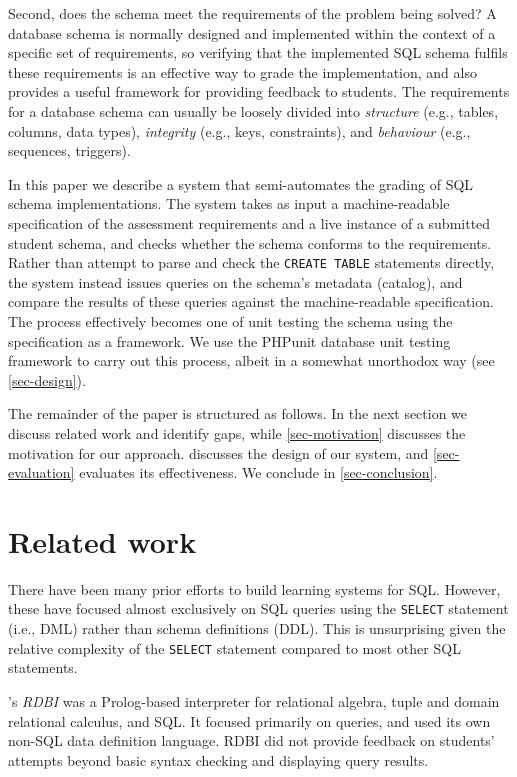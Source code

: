 \documentclass[sigconf, authordraft, capitalise]{acmart}
\begin{document}
Second, does the schema meet the requirements of the problem being solved? A database schema is normally designed and implemented within the context of a specific set of requirements, so verifying that the implemented SQL schema fulfils these requirements is an effective way to grade the implementation, and also provides a useful framework for providing feedback to students. The requirements for a database schema can usually be loosely divided into \emph{structure} (e.g., tables, columns, data types), \emph{integrity} (e.g., keys, constraints), and \emph{behaviour} (e.g., sequences, triggers).

In this paper we describe a system that semi-automates the grading of SQL schema implementations. The system takes as input a machine-readable specification of the assessment requirements and a live instance of a submitted student schema, and checks whether the schema conforms to the requirements. Rather than attempt to parse and check the \texttt{CREATE TABLE} statements directly, the system instead issues queries on the schema's metadata (catalog), and compare the results of these queries against the machine-readable specification. The process effectively becomes one of unit testing the schema using the specification as a framework. We use the PHPunit database unit testing framework to carry out this process, albeit in a somewhat unorthodox way (see \cref{sec-design}).

The remainder of the paper is structured as follows. In the next section we discuss related work and identify gaps, while \cref{sec-motivation} discusses the motivation for our approach.  discusses the design of our system, and \cref{sec-evaluation} evaluates its effectiveness. We conclude in \cref{sec-conclusion}.


\section{Related work}
\label{sec-literature}

There have been many prior efforts to build learning systems for SQL. However, these have focused almost exclusively on SQL queries using the \texttt{SELECT} statement (i.e., DML) rather than schema definitions (DDL). This is unsurprising given the relative complexity of the \texttt{SELECT} statement compared to most other SQL statements.

\citeauthor{Dietrich.S-1993a-An-educational}'s \emph{RDBI} \cite{Dietrich.S-1993a-An-educational} was a Prolog-based interpreter for relational algebra, tuple and domain relational calculus, and SQL. It focused primarily on queries, and used its own non-SQL data definition language. RDBI did not provide feedback on students' attempts beyond basic syntax checking and displaying query results. 
\end{document}
